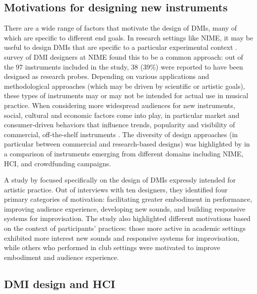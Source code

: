 \documentclass[Sullivan_phd_thesis.tex]{subfiles}
\begin{document}
\subsection{Motivations for designing new instruments}
\label{ch3-sec:motivations-for-designing-new-instruments}

There are a wide range of factors that motivate the design of DMIs, many of which are specific to different end goals. In research settings like NIME, it may be useful to design DMIs that are specific to a particular experimental context \parencite{Marquez-borbon2011}. \textcite{Morreale2017} survey of DMI designers at NIME found this to be a common approach: out of the 97 instruments included in the study, 38 (39\%) were reported to have been designed as research probes. Depending on various applications and methodological approaches (which may be driven by scientific or artistic goals), these types of instruments may or may not be intended for actual use in musical practice. When considering more widespread audiences for new instruments, social, cultural and economic factors come into play, in particular market and consumer-driven behaviors that influence trends, popularity and visibility of commercial, off-the-shelf instruments \parencite{Theberge1997}. The diversity of design approaches (in particular between commercial and research-based designs) was highlighted by \textcite{mcpherson2019musical} in a comparison of instruments emerging from different domains including NIME, HCI, and crowdfunding campaigns. 

A study by \textcite{Emerson2018} focused specifically on the design of DMIs expressly intended for artistic practice. Out of interviews with ten designers, they identified four primary categories of motivation: facilitating greater embodiment in performance, improving audience experience, developing new sounds, and building responsive systems for improvisation. The study also highlighted different motivations based on the context of participants' practices: those more active in academic settings exhibited more interest new sounds and responsive systems for improvisation, while others who performed in club settings were motivated to improve embodiment and audience experience.

\subsection{DMI design and HCI}
\label{ch3-sec:dmi-design-and-hci}
\end{document}
